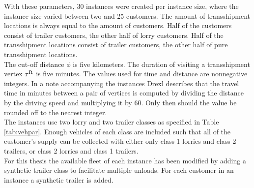 %
With these parameters, 30 instances
were created per instance size, where the instance size varied between two and 25 customers.
%
%
The amount of transshipment locations is always equal to the amount of customers.
Half of the customers consist of trailer customers, the other half of lorry customers.
Half of the transshipment locations consist of trailer customers, the other half of pure transshipment locations.
%
\\

The cut-off distance $\phi $ is five kilometers.
%
The duration of visiting a transshipment vertex $\tau^{\rm R}$ is five minutes.
%
The values used for time and distance are nonnegative integers.
In a note accompanying the instances Drexl describes that the travel time in minutes between a pair of vertices is computed by dividing the distance by the driving speed and multiplying it by 60. Only then should the value be rounded off to the nearest integer.
\\




The instances use two lorry and two trailer classes as specified in Table \ref{tab:vehpar}.
Enough vehicles of each class are included such that all of the customer's supply can be collected with either only class 1 lorries and class 2 trailers, or class 2 lorries and class 1 trailers.
\\

For this thesis the available fleet of each instance has been modified 
by adding a  synthetic trailer class to facilitate multiple unloads.
For each customer in an instance a synthetic trailer is added.
\\








